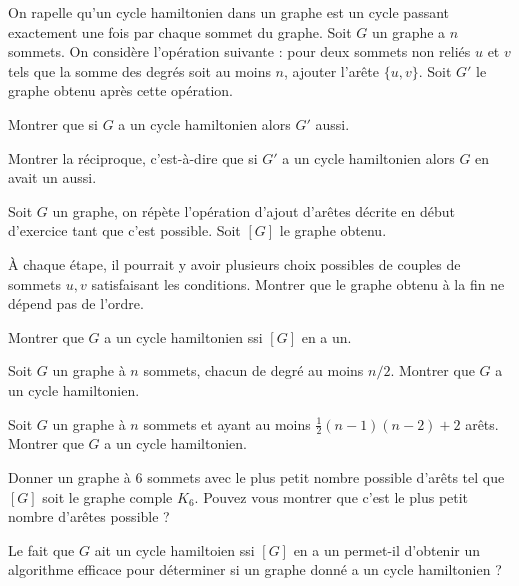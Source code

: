 \documentclass[french]{report}
\begin{document}
\begin{exo}
    On rapelle qu'un cycle hamiltonien dans un graphe est un cycle passant exactement
    une fois par chaque sommet du graphe. Soit \(G\) un graphe a \(n\) sommets. On
    considère l'opération suivante : pour deux sommets non reliés \(u\) et \(v\) tels
    que la somme des degrés soit au moins \(n\), ajouter l'arête \(\{u,v\}\). Soit
    \(G'\) le graphe obtenu après cette opération.
    \begin{q}{1}
        Montrer que si \(G\) a un cycle hamiltonien alors \(G'\) aussi.
    \end{q}
    \begin{q}{2}
        Montrer la réciproque, c'est-à-dire que si \(G'\) a un cycle hamiltonien
        alors \(G\) en avait un aussi.
    \end{q}
    Soit \(G\) un graphe, on répète l'opération d'ajout d'arêtes décrite en début
    d'exercice tant que c'est possible. Soit \([G]\) le graphe obtenu.
    \begin{q}{3}
        À chaque étape, il pourrait y avoir plusieurs choix possibles de couples
        de sommets \(u,v\) satisfaisant les conditions. Montrer que le graphe
        obtenu à la fin ne dépend pas de l'ordre.
    \end{q}
    \begin{q}{4}
        Montrer que \(G\) a un cycle hamiltonien ssi \([G]\) en a un.
    \end{q}
    \begin{q}{5}
        Soit \(G\) un graphe à \(n\) sommets, chacun de degré au moins \(n/2\). Montrer
        que \(G\) a un cycle hamiltonien.
    \end{q}
    \begin{q}{6}
        Soit \(G\) un graphe à \(n\) sommets et ayant au moins \(\frac12(n-1)(n-2)+2\)
        arêts. Montrer que \(G\) a un cycle hamiltonien.
    \end{q}
    \begin{q}{7}
        Donner un graphe à \(6\) sommets avec le plus petit nombre possible d'arêts tel
        que \([G]\) soit le graphe comple \(K_6\). Pouvez vous montrer que c'est le plus
        petit nombre d'arêtes possible ?
    \end{q}
    \begin{q}{8}
        Le fait que \(G\) ait un cycle hamiltoien ssi \([G]\) en a un permet-il
        d'obtenir un algorithme efficace pour déterminer si un graphe donné a un
        cycle hamiltonien ?
    \end{q}
\end{exo}
\end{document}
